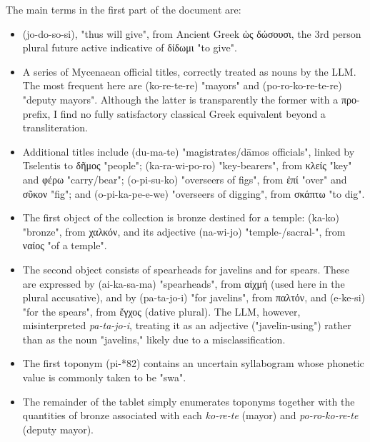 The main terms in the first part of the document are:
\begin{itemize}
  \item \textlinb{\Bjo\Bdo\Bso\Bi\Bsi} (jo-do-so-si), "thus will give", from Ancient Greek \textgreek{ὡς δώσουσι}, the 3rd person plural future active indicative of \textgreek{δίδωμι} "to give".
  \item A series of Mycenaean official titles, correctly treated as nouns by the LLM. The most frequent here are \textlinb{\Bko\Be\Bre\Bte\Bre} (ko-re-te-re) "mayors" and \textlinb{\Bpo\Bro\Bko\Be\Bre\Bte\Bre} (po-ro-ko-re-te-re) "deputy mayors".
  Although the latter is transparently the former with a \textgreek{προ-} prefix, I find no fully satisfactory classical Greek equivalent beyond a transliteration.
  \item Additional titles include \textlinb{\Bdu\Bma\Bte} (du-ma-te) "magistrates/dāmos officials", linked by Tselentis to \textgreek{δῆμος} "people"; \textlinb{\Bka\Bra\Bwi\Bpo\Bro} (ka-ra-wi-po-ro) "key-bearers", from \textgreek{κλείς} "key" and \textgreek{φέρω} "carry/bear"; \textlinb{\Bo\Bpi\Bsu\Bko} (o-pi-su-ko) "overseers of figs", from \textgreek{ἐπί} "over" and \textgreek{σῦκον} "fig"; and \textlinb{\Bo\Bpi\Bka\Bpe\Be\Bwe} (o-pi-ka-pe-e-we) "overseers of digging", from \textgreek{σκάπτω} "to dig".
  \item The first object of the collection is bronze destined for a temple: \textlinb{\Bka\Bko} (ka-ko) "bronze", from \textgreek{χαλκόν}, and its adjective \textlinb{\Bna\Bwi\Bjo} (na-wi-jo) "temple-/sacral-", from \textgreek{ναίος} "of a temple".
  \item The second object consists of spearheads for javelins and for spears.
  These are expressed by \textlinb{\Baiii\Bka\Bsa\Bma} (ai-ka-sa-ma) "spearheads", from \textgreek{αἰχμή} (used here in the plural accusative), and by \textlinb{\Bpa\Bta\Bjo\Bi} (pa-ta-jo-i) "for javelins", from \textgreek{παλτόν}, and \textlinb{\Be\Bke\Bsi} (e-ke-si) "for the spears", from \textgreek{ἔγχος} (dative plural).
  The LLM, however, misinterpreted \textit{pa-ta-jo-i}, treating it as an adjective ("javelin-using") rather than as the noun "javelins," likely due to a misclassification.  \item The first toponym \textlinb{\Bpi\Bswa} (pi-*82) contains an uncertain syllabogram whose phonetic value is commonly taken to be "swa".
  \item The remainder of the tablet simply enumerates toponyms together with the quantities of bronze associated with each \textit{ko-re-te} (mayor) and \textit{po-ro-ko-re-te} (deputy mayor).
\end{itemize}

